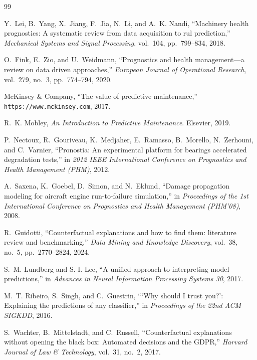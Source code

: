 \begin{thebibliography}{99}

Y.~Lei, B.~Yang, X.~Jiang, F.~Jia, N.~Li, and A.~K. Nandi,
``Machinery health prognostics: A systematic review from data acquisition to rul prediction,''
\textit{Mechanical Systems and Signal Processing}, vol.~104, pp.~799--834, 2018.

O.~Fink, E.~Zio, and U.~Weidmann,
``Prognostics and health management---a review on data driven approaches,''
\textit{European Journal of Operational Research}, vol.~279, no.~3, pp.~774--794, 2020.

McKinsey \& Company,
``The value of predictive maintenance,''
\texttt{https://www.mckinsey.com}, 2017.

R.~K. Mobley,
\textit{An Introduction to Predictive Maintenance}.
Elsevier, 2019.

P.~Nectoux, R.~Gouriveau, K.~Medjaher, E.~Ramasso, B.~Morello, N.~Zerhouni, and C.~Varnier,
``Pronostia: An experimental platform for bearings accelerated degradation tests,''
in \textit{2012 IEEE International Conference on Prognostics and Health Management (PHM)}, 2012.

A.~Saxena, K.~Goebel, D.~Simon, and N.~Eklund,
``Damage propagation modeling for aircraft engine run-to-failure simulation,''
in \textit{Proceedings of the 1st International Conference on Prognostics and Health Management (PHM'08)}, 2008.

R.~Guidotti,
``Counterfactual explanations and how to find them: literature review and benchmarking,''
\textit{Data Mining and Knowledge Discovery}, vol.~38, no.~5, pp.~2770--2824, 2024.

S.~M. Lundberg and S.-I. Lee,
``A unified approach to interpreting model predictions,''
in \textit{Advances in Neural Information Processing Systems 30}, 2017.

M.~T. Ribeiro, S.~Singh, and C.~Guestrin,
```Why should I trust you?': Explaining the predictions of any classifier,''
in \textit{Proceedings of the 22nd ACM SIGKDD}, 2016.

S.~Wachter, B.~Mittelstadt, and C.~Russell,
``Counterfactual explanations without opening the black box: Automated decisions and the GDPR,''
\textit{Harvard Journal of Law \& Technology}, vol.~31, no.~2, 2017.


\end{thebibliography}
